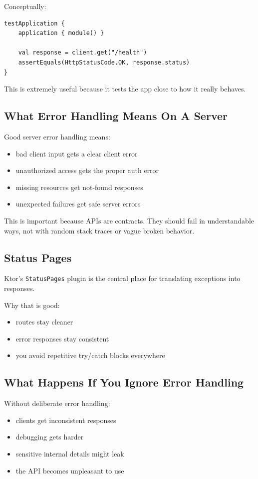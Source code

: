 \documentclass[11pt,a4paper]{article}
\begin{document}
Conceptually:

\begin{lstlisting}[style=kazekotlin]
testApplication {
    application { module() }

    val response = client.get("/health")
    assertEquals(HttpStatusCode.OK, response.status)
}
\end{lstlisting}

This is extremely useful because it tests the app close to how it really behaves.

\subsection{What Error Handling Means On A Server}

Good server error handling means:
\begin{itemize}
    \item bad client input gets a clear client error
    \item unauthorized access gets the proper auth error
    \item missing resources get not-found responses
    \item unexpected failures get safe server errors
\end{itemize}

This is important because APIs are contracts. They should fail in understandable ways, not with random stack traces or vague broken behavior.

\subsection{Status Pages}

Ktor's \texttt{StatusPages} plugin is the central place for translating exceptions into responses.

Why that is good:
\begin{itemize}
    \item routes stay cleaner
    \item error responses stay consistent
    \item you avoid repetitive try/catch blocks everywhere
\end{itemize}

\subsection{What Happens If You Ignore Error Handling}

Without deliberate error handling:
\begin{itemize}
    \item clients get inconsistent responses
    \item debugging gets harder
    \item sensitive internal details might leak
    \item the API becomes unpleasant to use
\end{itemize}
\end{document}
